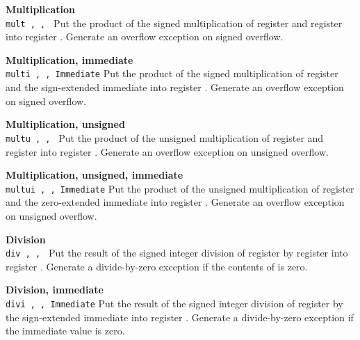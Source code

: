 \noindent
{\bf Multiplication}\\
\noindent
\texttt{mult \regd, \regs, \regt}
Put the product of the signed multiplication of register \regs{} and register \regt{}
into register \regd{}. Generate an overflow exception on signed overflow.
\vspace{3ex}
\newpage

\noindent
{\bf Multiplication, immediate}\\
\noindent
\texttt{multi \regd, \regs, Immediate}
Put the product of the signed multiplication of register \regs{} and the sign-extended immediate
into register \regd{}. Generate an overflow exception on signed overflow.
\vspace{3ex}

\noindent
{\bf Multiplication, unsigned}\\
\noindent
\texttt{multu \regd, \regs, \regt}
Put the product of the unsigned multiplication of register \regs{} and register \regt{}
into register \regd{}. Generate an overflow exception on unsigned overflow.
\vspace{3ex}

\noindent
{\bf Multiplication, unsigned, immediate}\\
\noindent
\texttt{multui \regd, \regs, Immediate}
Put the product of the unsigned multiplication of register \regs{} and the zero-extended immediate
into register \regd{}. Generate an overflow exception on unsigned overflow.
\vspace{3ex}

\noindent
{\bf Division}\\
\noindent
\texttt{div \regd, \regs, \regt}
Put the result of the signed integer division of register \regs{} by register \regt{}
into register \regd{}. Generate a divide-by-zero exception if the contents of \regt{} is zero.
\vspace{3ex}

\noindent
{\bf Division, immediate}\\
\noindent
\texttt{divi \regd, \regs, Immediate}
Put the result of the signed integer division of register \regs{} by the sign-extended immediate
into register \regd{}. Generate a divide-by-zero exception if the immediate value is zero.
\vspace{3ex}

